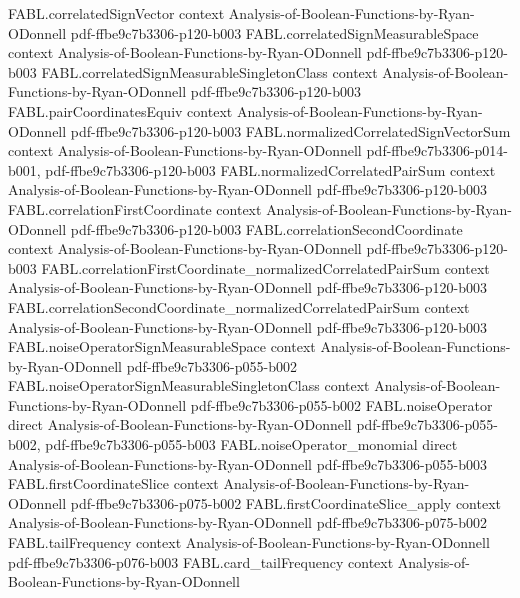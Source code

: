 \begin{theorem}
  {FABL.correlatedSignVector}
  {context}
  {Analysis-of-Boolean-Functions-by-Ryan-ODonnell}
  {pdf-ffbe9c7b3306-p120-b003}
\proofstep
  {FABL.correlatedSignMeasurableSpace}
  {context}
  {Analysis-of-Boolean-Functions-by-Ryan-ODonnell}
  {pdf-ffbe9c7b3306-p120-b003}
\proofstep
  {FABL.correlatedSignMeasurableSingletonClass}
  {context}
  {Analysis-of-Boolean-Functions-by-Ryan-ODonnell}
  {pdf-ffbe9c7b3306-p120-b003}
\proofstep
  {FABL.pairCoordinatesEquiv}
  {context}
  {Analysis-of-Boolean-Functions-by-Ryan-ODonnell}
  {pdf-ffbe9c7b3306-p120-b003}
\proofstep
  {FABL.normalizedCorrelatedSignVectorSum}
  {context}
  {Analysis-of-Boolean-Functions-by-Ryan-ODonnell}
  {pdf-ffbe9c7b3306-p014-b001,
    pdf-ffbe9c7b3306-p120-b003}
\proofstep
  {FABL.normalizedCorrelatedPairSum}
  {context}
  {Analysis-of-Boolean-Functions-by-Ryan-ODonnell}
  {pdf-ffbe9c7b3306-p120-b003}
\proofstep
  {FABL.correlationFirstCoordinate}
  {context}
  {Analysis-of-Boolean-Functions-by-Ryan-ODonnell}
  {pdf-ffbe9c7b3306-p120-b003}
\proofstep
  {FABL.correlationSecondCoordinate}
  {context}
  {Analysis-of-Boolean-Functions-by-Ryan-ODonnell}
  {pdf-ffbe9c7b3306-p120-b003}
\proofstep
  {FABL.correlationFirstCoordinate_normalizedCorrelatedPairSum}
  {context}
  {Analysis-of-Boolean-Functions-by-Ryan-ODonnell}
  {pdf-ffbe9c7b3306-p120-b003}
\proofstep
  {FABL.correlationSecondCoordinate_normalizedCorrelatedPairSum}
  {context}
  {Analysis-of-Boolean-Functions-by-Ryan-ODonnell}
  {pdf-ffbe9c7b3306-p120-b003}
\proofstep
  {FABL.noiseOperatorSignMeasurableSpace}
  {context}
  {Analysis-of-Boolean-Functions-by-Ryan-ODonnell}
  {pdf-ffbe9c7b3306-p055-b002}
\proofstep
  {FABL.noiseOperatorSignMeasurableSingletonClass}
  {context}
  {Analysis-of-Boolean-Functions-by-Ryan-ODonnell}
  {pdf-ffbe9c7b3306-p055-b002}
\proofstep
  {FABL.noiseOperator}
  {direct}
  {Analysis-of-Boolean-Functions-by-Ryan-ODonnell}
  {pdf-ffbe9c7b3306-p055-b002,
    pdf-ffbe9c7b3306-p055-b003}
\proofstep
  {FABL.noiseOperator_monomial}
  {direct}
  {Analysis-of-Boolean-Functions-by-Ryan-ODonnell}
  {pdf-ffbe9c7b3306-p055-b003}
\proofstep
  {FABL.firstCoordinateSlice}
  {context}
  {Analysis-of-Boolean-Functions-by-Ryan-ODonnell}
  {pdf-ffbe9c7b3306-p075-b002}
\proofstep
  {FABL.firstCoordinateSlice_apply}
  {context}
  {Analysis-of-Boolean-Functions-by-Ryan-ODonnell}
  {pdf-ffbe9c7b3306-p075-b002}
\proofstep
  {FABL.tailFrequency}
  {context}
  {Analysis-of-Boolean-Functions-by-Ryan-ODonnell}
  {pdf-ffbe9c7b3306-p076-b003}
\proofstep
  {FABL.card_tailFrequency}
  {context}
  {Analysis-of-Boolean-Functions-by-Ryan-ODonnell}

\end{theorem}

